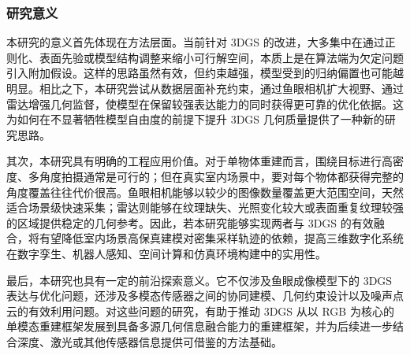 \subsubsection{研究意义}

本研究的意义首先体现在方法层面。当前针对 3DGS 的改进，大多集中在通过正则化、表面先验或模型结构调整来缩小可行解空间，本质上是在算法端为欠定问题引入附加假设。这样的思路虽然有效，但约束越强，模型受到的归纳偏置也可能越明显。相比之下，本研究尝试从数据层面补充约束，通过鱼眼相机扩大视野、通过雷达增强几何监督，使模型在保留较强表达能力的同时获得更可靠的优化依据。这为如何在不显著牺牲模型自由度的前提下提升 3DGS 几何质量提供了一种新的研究思路。

其次，本研究具有明确的工程应用价值。对于单物体重建而言，围绕目标进行高密度、多角度拍摄通常是可行的；但在真实室内场景中，要对每个物体都获得完整的角度覆盖往往代价很高。鱼眼相机能够以较少的图像数量覆盖更大范围空间，天然适合场景级快速采集；雷达则能够在纹理缺失、光照变化较大或表面重复纹理较强的区域提供稳定的几何参考。因此，若本研究能够实现两者与 3DGS 的有效融合，将有望降低室内场景高保真建模对密集采样轨迹的依赖，提高三维数字化系统在数字孪生、机器人感知、空间计算和仿真环境构建中的实用性。

最后，本研究也具有一定的前沿探索意义。它不仅涉及鱼眼成像模型下的 3DGS 表达与优化问题，还涉及多模态传感器之间的协同建模、几何约束设计以及噪声点云的有效利用问题。对这些问题的研究，有助于推动 3DGS 从以 RGB 为核心的单模态重建框架发展到具备多源几何信息融合能力的重建框架，并为后续进一步结合深度、激光或其他传感器信息提供可借鉴的方法基础。
